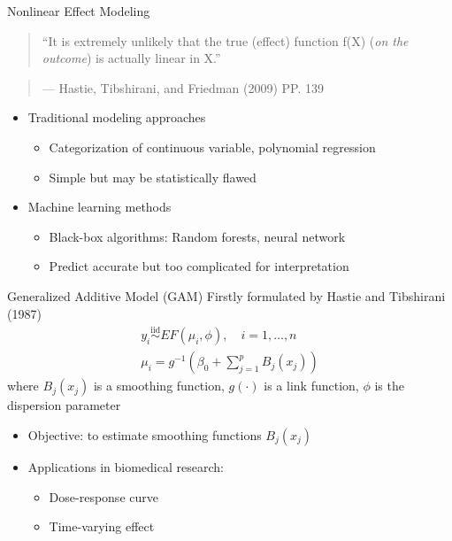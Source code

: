 \documentclass[
  ignorenonframetext,
  aspectratio=169]{beamer}
\providecommand{\tightlist}{%
  \setlength{\itemsep}{0pt}\setlength{\parskip}{0pt}}
\newcommand{\simiid}{\overset{\text{iid}}{\sim}}
\begin{document}
\begin{frame}{Nonlinear Effect Modeling}
\protect\hypertarget{nonlinear-effect-modeling}{}
\begin{quote}
``It is extremely unlikely that the true (effect) function f(X)
(\emph{on the outcome}) is actually linear in X.'' \hspace*{2cm}
\end{quote}

\begin{quote}
--- Hastie, Tibshirani, and Friedman (2009) PP. 139
\end{quote}

\begin{itemize}
\tightlist
\item
  Traditional modeling approaches

  \begin{itemize}
  \tightlist
  \item
    Categorization of continuous variable, polynomial regression
  \item
    Simple but may be statistically flawed
  \end{itemize}
\item
  Machine learning methods

  \begin{itemize}
  \tightlist
  \item
    Black-box algorithms: Random forests, neural network
  \item
    Predict accurate but too complicated for interpretation
  \end{itemize}
\end{itemize}
\end{frame}

\begin{frame}{Generalized Additive Model (GAM)}
\protect\hypertarget{generalized-additive-model-gam}{}
Firstly formulated by Hastie and Tibshirani (1987) \begin{align*}
  y_i \simiid EF(\mu_i, \phi), \quad i = 1, \dots, n\\
  \mu_i = g^{-1}(\beta_0 + \sum\limits^p_{j=1}B_j(x_j))
\end{align*} where \(B_j(x_j)\) is a smoothing function, \(g(\cdot)\) is
a link function, \(\phi\) is the dispersion parameter

\begin{itemize}
\tightlist
\item
  Objective: to estimate smoothing functions \(B_j(x_j)\)
\item
  Applications in biomedical research:

  \begin{itemize}
  \tightlist
  \item
    Dose-response curve
  \item
    Time-varying effect
  \end{itemize}
\end{itemize}
\end{frame}
\end{document}
